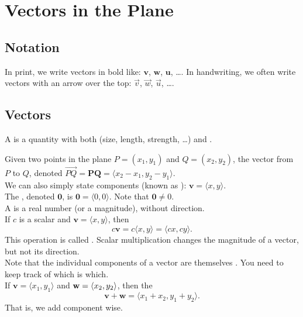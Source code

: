\section{Vectors in the Plane}

\subsection{Notation}

In print, we write vectors in bold like: $\mathbf{v}$, $\mathbf{w}$, $\mathbf{u}$, \dots.  In handwriting, we often write vectors with an arrow over the top: $\vec{v}$, $\vec{w}$, $\vec{u}$, \dots.

\subsection{Vectors}

A  is a quantity with both  (size, length, strength, \dots) and .  

Given two points in the plane \(P = (x_{1},y_{1})\) and \(Q = (x_{2},y_{2})\), the vector from \(P\) to \(Q\), denoted \(\overrightarrow{PQ} = \mathbf{PQ} = \langle x_{2}-x_{1},y_{2}-y_{1}\rangle\). \\

We can also simply state components (known as ): \(\mathbf{v} = \langle x, y\rangle\). \\

The , denoted \(\mathbf{0}\), is \(\mathbf{0} = \langle 0,0 \rangle\). Note that \(\mathbf{0} \ne 0\). \\

A  is a real number (or a magnitude), without direction. \\

If \(c\) is a scalar and \(\mathbf{v} = \langle x,y\rangle\), then
\[
    c\mathbf{v} = c\langle x,y\rangle = \langle cx,cy\rangle.
\]
This operation is called . Scalar multiplication changes the magnitude of a vector, but not its direction. \\

Note that the individual components of a vector are themselves . You need to keep track of which is which. \\

If \(\mathbf{v} = \langle x_{1},y_{1} \rangle\) and \(\mathbf{w} = \left\langle x_{2},y_{2} \right\rangle\), then the  
\[
    \mathbf{v} + \mathbf{w} = \langle x_{1}+x_{2},y_{1}+y_{2}\rangle.
\] 
That is, we add component wise. \\

